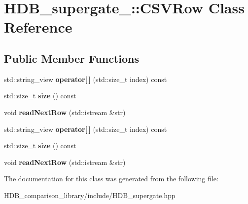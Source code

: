 \hypertarget{classHDB__supergate___1_1CSVRow}{}\section{H\+D\+B\+\_\+supergate\+\_\+\+:\+:C\+S\+V\+Row Class Reference}
\label{classHDB__supergate___1_1CSVRow}
\subsection*{Public Member Functions}
\begin{DoxyCompactItemize}
\item 
\mbox{\label{classHDB__supergate___1_1CSVRow_ad53893676cbab556654c9a2f30514620}} 
std\+::string\+\_\+view {\bfseries operator\mbox{[}$\,$\mbox{]}} (std\+::size\+\_\+t index) const
\item 
\mbox{\label{classHDB__supergate___1_1CSVRow_afe26c84aa24a18cd027219b17556ffc8}} 
std\+::size\+\_\+t {\bfseries size} () const
\item 
\mbox{\label{classHDB__supergate___1_1CSVRow_ae2aeeac10b08811b18e4457af578cc00}} 
void {\bfseries read\+Next\+Row} (std\+::istream \&str)
\item 
\mbox{\label{classHDB__supergate___1_1CSVRow_ad53893676cbab556654c9a2f30514620}} 
std\+::string\+\_\+view {\bfseries operator\mbox{[}$\,$\mbox{]}} (std\+::size\+\_\+t index) const
\item 
\mbox{\label{classHDB__supergate___1_1CSVRow_afe26c84aa24a18cd027219b17556ffc8}} 
std\+::size\+\_\+t {\bfseries size} () const
\item 
\mbox{\label{classHDB__supergate___1_1CSVRow_ae2aeeac10b08811b18e4457af578cc00}} 
void {\bfseries read\+Next\+Row} (std\+::istream \&str)
\end{DoxyCompactItemize}


The documentation for this class was generated from the following file\+:\begin{DoxyCompactItemize}
\item 
H\+D\+B\+\_\+comparison\+\_\+library/include/H\+D\+B\+\_\+supergate.\+hpp\end{DoxyCompactItemize}
